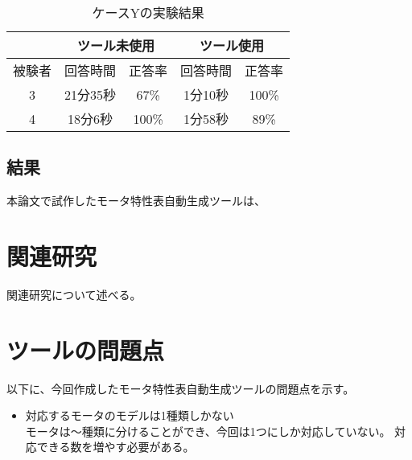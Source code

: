 \begin{table}[tp]
  \begin{center}
    \caption{ケースYの実験結果}
    \label{resultY}
    \begin{tabular}{c|c|c|c|c|}
    \cline{2-5}
                              & \multicolumn{2}{c|}{ツール未使用} & \multicolumn{2}{c|}{ツール使用} \\ \hline
    \multicolumn{1}{|c||}{被験者} & 回答時間           & 正答率          & 回答時間           & 正答率         \\ \hline\hline
    \multicolumn{1}{|c||}{3}   & 21分35秒           & 67\%         & 1分10秒           & 100\%         \\ \hline
    \multicolumn{1}{|c||}{4}   & 18分6秒          & 100\%          & 1分58秒          & 89\%         \\ \hline
    \end{tabular}
  \end{center}
\end{table}


\subsection{結果}
本論文で試作したモータ特性表自動生成ツールは、

\section{関連研究}

	関連研究について述べる。

\section{ツールの問題点}

以下に、今回作成したモータ特性表自動生成ツールの問題点を示す。

\begin{itemize}
	\item 対応するモータのモデルは1種類しかない\\
		  モータは～種類に分けることができ、今回は1つにしか対応していない。
		  対応できる数を増やす必要がある。
		
\end{itemize}







